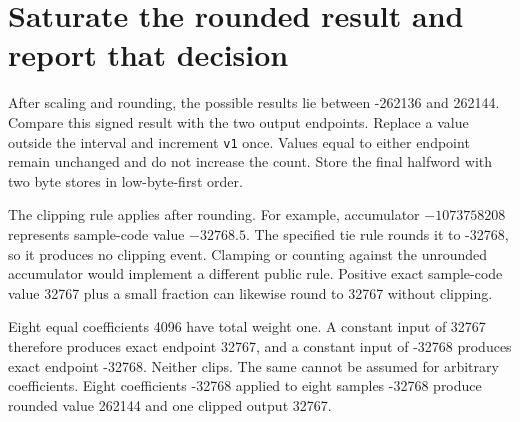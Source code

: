 \section{Saturate the rounded result and report that decision}
After scaling and rounding, the possible results lie between -262136 and 262144.
Compare this signed result with the two output endpoints. Replace a value outside
the interval and increment \texttt{v1} once. Values equal to either endpoint remain
unchanged and do not increase the count. Store the final halfword with two byte
stores in low-byte-first order.

The clipping rule applies after rounding. For example, accumulator
\(-1073758208\) represents sample-code value \(-32768.5\). The specified tie rule
rounds it to -32768, so it produces no clipping event. Clamping or counting against
the unrounded accumulator would implement a different public rule. Positive exact
sample-code value 32767 plus a small fraction can likewise round to 32767 without
clipping.

Eight equal coefficients 4096 have total weight one. A constant input of 32767
therefore produces exact endpoint 32767, and a constant input of -32768 produces
exact endpoint -32768. Neither clips. The same cannot be assumed for arbitrary
coefficients. Eight coefficients -32768 applied to eight samples -32768 produce
rounded value 262144 and one clipped output 32767.
